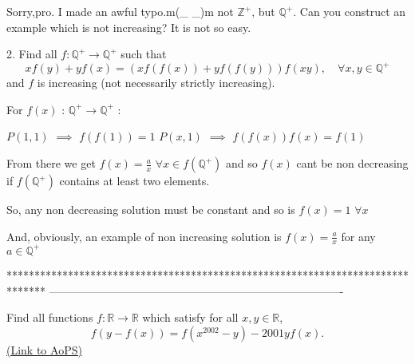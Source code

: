 \begin{solution}
	\begin{tcolorbox}Sorry,pro. I made an awful typo.m(_ _)m
not $\mathbb{Z}^+$, but $\mathbb{Q}^+$.
Can you construct an example which is not increasing? It is not so easy.\end{tcolorbox}

\begin{tcolorbox}
2. Find all $f:\mathbb Q^+ \to \mathbb Q^+$ such that
\[xf(y)+yf(x)=(xf(f(x))+yf(f(y)))f(xy), \quad \forall x,y \in \mathbb Q^+\]
and $f$ is increasing (not necessarily strictly increasing).\end{tcolorbox}


For $f(x)$ : $\mathbb Q^+\to\mathbb Q^+$ :

$P(1,1)$ $\implies$ $f(f(1))=1$
$P(x,1)$ $\implies$ $f(f(x))f(x)=f(1)$

From there we get $f(x)=\frac ax$ $\forall x\in f(\mathbb Q^+)$ and so $f(x)$ cant be non decreasing if $f(\mathbb Q^+)$ contains at least two elements.

So, any non decreasing solution must be constant and so is $f(x)=1$ $\forall x$

And, obviously, an example of non increasing solution is $f(x)=\frac ax$ for any $a\in\mathbb Q^+$
\end{solution}
*******************************************************************************
-------------------------------------------------------------------------------

\begin{problem}
	Find all functions $f: \mathbb R \to \mathbb R$ which satisfy for all $x, y \in \mathbb R$,
\[ f(y-f(x))=f(x^{2002}-y)-2001yf(x). \]
	\flushright \href{https://artofproblemsolving.com/community/c6h439927}{(Link to AoPS)}
\end{problem}



